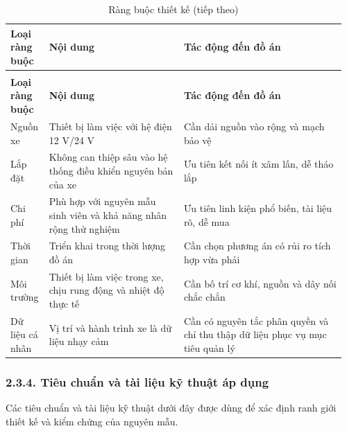 \documentclass[a4paper]{extarticle}
\newcommand{\thesissettableid}[2]{%
  \renewcommand{\thetable}{#1}%
  \renewcommand{\theHtable}{#2}%
}
\begin{document}
{\thesissettableid{2.5}{condensed-bang-2-5-rang-buoc-thiet-ke}
\def\LTcaptype{table}
\begin{longtable}{|L{0.095\linewidth}|L{0.391\linewidth}|L{0.472\linewidth}|}
\caption{Ràng buộc thiết kế}\label{tab:condensed-bang-2-5-rang-buoc-thiet-ke}\\
\hline
\textbf{Loại ràng buộc} & \textbf{Nội dung} & \textbf{Tác động đến đồ án} \\
\hline
\endfirsthead
\caption[]{Ràng buộc thiết kế (tiếp theo)}\\
\hline
\textbf{Loại ràng buộc} & \textbf{Nội dung} & \textbf{Tác động đến đồ án} \\
\hline
\endhead
\endfoot
\endlastfoot
Nguồn xe & Thiết bị làm việc với hệ điện 12 V/24 V & Cần dải nguồn vào rộng và mạch bảo vệ \\\hline
Lắp đặt & Không can thiệp sâu vào hệ thống điều khiển nguyên bản của xe & Ưu tiên kết nối ít xâm lấn, dễ tháo lắp \\\hline
Chi phí & Phù hợp với nguyên mẫu sinh viên và khả năng nhân rộng thử nghiệm & Ưu tiên linh kiện phổ biến, tài liệu rõ, dễ mua \\\hline
Thời gian & Triển khai trong thời lượng đồ án & Cần chọn phương án có rủi ro tích hợp vừa phải \\\hline
Môi trường & Thiết bị làm việc trong xe, chịu rung động và nhiệt độ thực tế & Cần bố trí cơ khí, nguồn và dây nối chắc chắn \\\hline
Dữ liệu cá nhân & Vị trí và hành trình xe là dữ liệu nhạy cảm & Cần có nguyên tắc phân quyền và chỉ thu thập dữ liệu phục vụ mục tiêu quản lý \\\hline
\end{longtable}
}

\subsubsection{2.3.4. Tiêu chuẩn và tài liệu kỹ thuật áp dụng}\label{tiuxeau-chuux1ea9n-vuxe0-tuxe0i-liux1ec7u-kux1ef9-thuux1eadt-uxe1p-dux1ee5ng}

Các tiêu chuẩn và tài liệu kỹ thuật dưới đây được dùng để xác định ranh giới thiết kế và kiểm chứng của nguyên mẫu.
\end{document}
